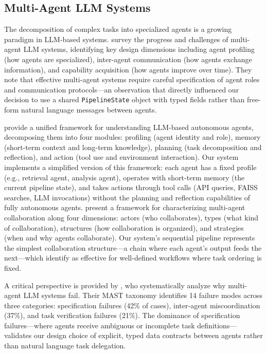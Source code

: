 \documentclass[12pt,a4paper]{article}
\begin{document}
\subsection{Multi-Agent LLM Systems}

The decomposition of complex tasks into specialized agents is a growing paradigm in LLM-based systems. \citet{guo2024multiagent} survey the progress and challenges of multi-agent LLM systems, identifying key design dimensions including agent profiling (how agents are specialized), inter-agent communication (how agents exchange information), and capability acquisition (how agents improve over time). They note that effective multi-agent systems require careful specification of agent roles and communication protocols---an observation that directly influenced our decision to use a shared \texttt{PipelineState} object with typed fields rather than free-form natural language messages between agents.

\citet{wang2024autonomousagents} provide a unified framework for understanding LLM-based autonomous agents, decomposing them into four modules: profiling (agent identity and role), memory (short-term context and long-term knowledge), planning (task decomposition and reflection), and action (tool use and environment interaction). Our system implements a simplified version of this framework: each agent has a fixed profile (e.g., retrieval agent, analysis agent), operates with short-term memory (the current pipeline state), and takes actions through tool calls (API queries, FAISS searches, LLM invocations) without the planning and reflection capabilities of fully autonomous agents. \citet{tran2025collaboration} present a framework for characterizing multi-agent collaboration along four dimensions: actors (who collaborates), types (what kind of collaboration), structures (how collaboration is organized), and strategies (when and why agents collaborate). Our system's sequential pipeline represents the simplest collaboration structure---a chain where each agent's output feeds the next---which \citet{tran2025collaboration} identify as effective for well-defined workflows where task ordering is fixed.

A critical perspective is provided by \citet{cemri2025mast}, who systematically analyze why multi-agent LLM systems fail. Their MAST taxonomy identifies 14 failure modes across three categories: specification failures (42\% of cases), inter-agent miscoordination (37\%), and task verification failures (21\%). The dominance of specification failures---where agents receive ambiguous or incomplete task definitions---validates our design choice of explicit, typed data contracts between agents rather than natural language task delegation.
\end{document}
